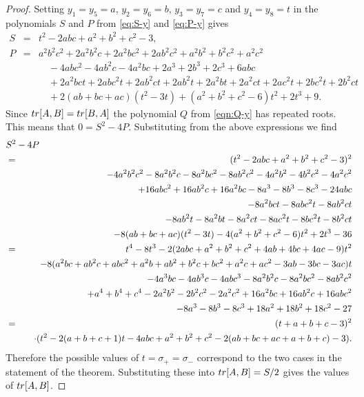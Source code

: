 \documentclass[10pt,a4paper]{amsart}
\begin{document}
\begin{proof}
Setting $y_1=y_5=a$, $y_2=y_6=b$, $y_3=y_7=c$ and $y_4=y_8=t$ in the polynomials $S$ and $P$ 
from \eqref{eq:S-y} and \eqref{eq:P-y} gives
\begin{eqnarray*}
S & = & t^2-2abc+a^2+b^2+c^2-3, \\
P & = & a^2b^2c^2 +2a^2b^2c+2a^2bc^2+2ab^2c^2 +a^2b^2+b^2c^2+a^2c^2  \\
&& \quad -4abc^2-4ab^2c-4a^2bc +2a^3+2b^3+2c^3 +6abc \\
&& \quad + 2a^2bct+2abc^2t+2ab^2ct + 2ab^2t+2a^2bt+2a^2ct+2ac^2t+2bc^2t+2b^2ct \\
&& \quad + 2(ab+bc+ac)(t^2-3t) + (a^2+b^2+c^2-6)t^2+2t^3+9.
\end{eqnarray*}
Since ${\rm tr}[A,B]={\rm tr}[B,A]$ the polynomial $Q$ from \eqref{eqn:Q-y} has repeated roots. This means 
that $0=S^2-4P$. Substituting from the above expressions we find
\begin{eqnarray*}
\lefteqn{S^2-4P} \\ 
& = & (t^2-2abc+a^2+b^2+c^2-3)^2 \\
&& \quad -4a^2b^2c^2 -8a^2b^2c-8a^2bc^2-8ab^2c^2 -4a^2b^2-4b^2c^2-4a^2c^2  \\
&& \quad +16abc^2+16ab^2c+16a^2bc -8a^3-8b^3-8c^3 -24abc \\
&& \quad -8a^2bct-8abc^2t-8ab^2ct \\
&&\quad -8ab^2t-8a^2bt-8a^2ct-8ac^2t-8bc^2t-8b^2ct \\
&& \quad -8(ab+bc+ac)(t^2-3t) -4(a^2+b^2+c^2-6)t^2+2t^3-36 \\
& = & t^4-8t^3-2(2abc+a^2+b^2+c^2+4ab+4bc+4ac-9)t^2\\ 
&& \quad -8(a^2bc+ab^2c+abc^2+a^2b+ab^2+b^2c+bc^2+a^2c+ac^2-3ab-3bc-3ac)t\\ 
&& \quad -4a^3bc-4ab^3c-4abc^3-8a^2b^2c-8a^2bc^2-8ab^2c^2\\ 
&& \quad +a^4+b^4+c^4-2a^2b^2-2b^2c^2-2a^2c^2+16a^2bc+16ab^2c+16abc^2\\ 
&& \quad -8a^3-8b^3-8c^3+18a^2+18b^2+18c^2-27\\ 
& = & (t+a+b+c-3)^2\\ 
&& \quad \cdot (t^2-2(a+b+c+1)t-4abc+a^2+b^2+c^2-2(ab+bc+ac+a+b+c)-3).\nonumber
\end{eqnarray*}
Therefore the possible values of $t=\sigma_+=\sigma_-$ correspond to the two cases in the statement
of the theorem. Substituting these into ${\rm tr}[A,B]=S/2$ gives the values of ${\rm tr}[A,B]$.
\end{proof}
\end{document}
